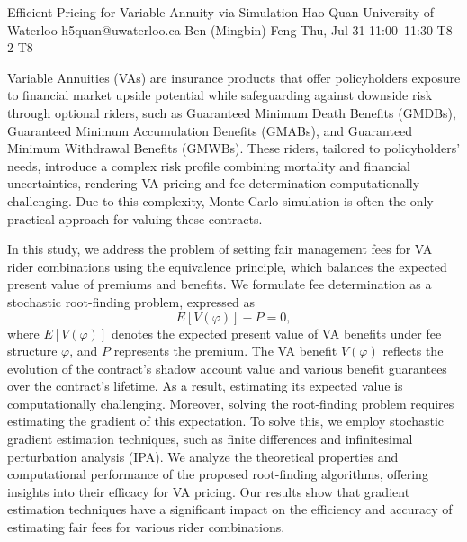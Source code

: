 \documentclass[12pt,lettersize,oneside]{book} %
\begin{document}
\begin{talk}
\end{talk}

\begin{talk}
  {Efficient Pricing for Variable Annuity via Simulation}%
  {Hao Quan}%
  {University of Waterloo}%
  {h5quan@uwaterloo.ca}%
  {Ben (Mingbin) Feng}%
  {}%
  {Thu, Jul 31 11:00--11:30}%
  {T8-2}%
  {T8}%
  
    

Variable Annuities (VAs) are insurance products that offer policyholders exposure to financial market upside potential while safeguarding against downside risk through optional riders, such as Guaranteed Minimum Death Benefits (GMDBs), Guaranteed Minimum Accumulation Benefits (GMABs), and Guaranteed Minimum Withdrawal Benefits (GMWBs). These riders, tailored to policyholders’ needs, introduce a complex risk profile combining mortality and financial uncertainties, rendering VA pricing and fee determination computationally challenging. Due to this complexity, Monte Carlo simulation is often the only practical approach for valuing these contracts.

In this study, we address the problem of setting fair management fees for VA rider combinations using the equivalence principle, which balances the expected present value of premiums and benefits. We formulate fee determination as a stochastic root-finding problem, expressed as
\[
E[V(\varphi)] - P = 0,
\]
where \( E[V(\varphi)] \) denotes the expected present value of VA benefits under fee structure \( \varphi \), and \( P \) represents the premium. The VA benefit \( V(\varphi) \) reflects the evolution of the contract’s shadow account value and various benefit guarantees over the contract’s lifetime. As a result, estimating its expected value is computationally challenging. Moreover, solving the root-finding problem requires estimating the gradient of this expectation. To solve this, we employ stochastic gradient estimation techniques, such as finite differences and infinitesimal perturbation analysis (IPA). We analyze the theoretical properties and computational performance of the proposed root-finding algorithms, offering insights into their efficacy for VA pricing. Our results show that gradient estimation techniques have a significant impact on the efficiency and accuracy of estimating fair fees for various rider combinations.
\end{talk}
\end{document}
